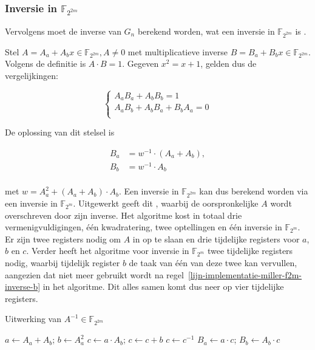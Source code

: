 \subsubsection{Inversie in $\mathbb{F}_{2^{2m}}$}

Vervolgens moet de inverse van $G_n$ berekend worden, wat een inversie in $\mathbb{F}_{2^{2m}}$ is \cite{beuchat}.

Stel $A = A_a + A_b x \in \mathbb{F}_{2^{2m}}, A \neq 0$ met multiplicatieve inverse $B = B_a + B_b x \in \mathbb{F}_{2^{2m}}$. Volgens de definitie is $A \cdot B = 1$. Gegeven $x^2 = x + 1$, gelden dus de vergelijkingen:

\[\left\{\begin{array}{l}
A_a B_a + A_b B_b = 1\\
A_a B_b + A_b B_a + B_b A_a = 0\\
\end{array}\right.\]

De oplossing van dit stelsel is

\[\begin{aligned}
B_a	&= w^{-1} \cdot (A_a + A_b),\\
B_b	&= w^{-1} \cdot A_b\\
\end{aligned}\]

met $w = A_a^2 + (A_a + A_b) \cdot A_b$. Een inversie in $\mathbb{F}_{2^{2m}}$ kan dus berekend worden via een inversie in $\mathbb{F}_{2^m}$. Uitgewerkt geeft dit , waarbij de oorspronkelijke $A$ wordt overschreven door zijn inverse. Het algoritme kost in totaal drie vermenigvuldigingen, \'e\'en kwadratering, twee optellingen en \'e\'en inversie in $\mathbb{F}_{2^m}$. Er zijn twee registers nodig om $A$ in op te slaan en drie tijdelijke registers voor $a$, $b$ en $c$. Verder heeft het algoritme voor inversie in $\mathbb{F}_{2^m}$ twee tijdelijke registers nodig, waarbij tijdelijk register $b$ de taak van \'e\'en van deze twee kan vervullen, aangezien dat niet meer gebruikt wordt na regel~\ref{lijn-implementatie-miller-f2m-inverse-b} in het algoritme. Dit alles samen komt dus neer op vier tijdelijke registers.

\begin{algorithm}[h]
	\caption{Uitwerking van $A^{-1} \in \mathbb{F}_{2^{2m}}$}
	\label{algoritme-implementatie-miller-f2m-inverse}
	$a \leftarrow A_a + A_b$; $b \leftarrow A_a^2$\;
	$c \leftarrow a \cdot A_b$; $c \leftarrow c + b$\;
	$c \leftarrow c^{-1}$\;
	$B_a \leftarrow a \cdot c$; $B_b \leftarrow A_b \cdot c$\;
\end{algorithm}

